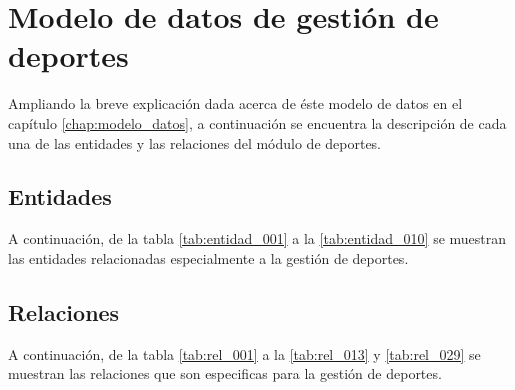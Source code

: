 \clearpage





\section{Modelo de datos de gestión de deportes}
Ampliando la breve explicación dada acerca de éste modelo de datos en el capítulo \ref{chap:modelo_datos}, a continuación se encuentra la descripción de cada una de las entidades y las relaciones del módulo de deportes.

\subsection{Entidades}
A continuación, de la tabla \ref{tab:entidad_001} a la \ref{tab:entidad_010} se muestran las entidades relacionadas especialmente a la gestión de deportes.

\clearpage










\subsection{Relaciones}
A continuación, de la tabla \ref{tab:rel_001} a la \ref{tab:rel_013} y \ref{tab:rel_029} se muestran las relaciones que son especificas para la gestión de deportes.

\clearpage














